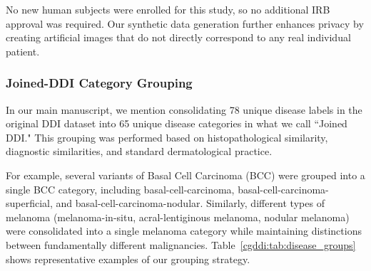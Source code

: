\documentclass[11pt]{ucthesis}
\begin{document}
No new human subjects were enrolled for this study, so no additional IRB approval was required. Our synthetic data generation further enhances privacy by creating artificial images that do not directly correspond to any real individual patient.

\subsubsection{Joined-DDI Category Grouping}
In our main manuscript, we mention consolidating 78 unique disease labels in the original DDI dataset into 65 unique disease categories in what we call ``Joined DDI." This grouping was performed based on histopathological similarity, diagnostic similarities, and standard dermatological practice.

For example, several variants of Basal Cell Carcinoma (BCC) were grouped into a single BCC category, including basal-cell-carcinoma, basal-cell-carcinoma-superficial, and basal-cell-carcinoma-nodular. Similarly, different types of melanoma (melanoma-in-situ, acral-lentiginous melanoma, nodular melanoma) were consolidated into a single melanoma category while maintaining distinctions between fundamentally different malignancies. Table~\ref{cgddi:tab:disease_groups} shows representative examples of our grouping strategy.
\end{document}
